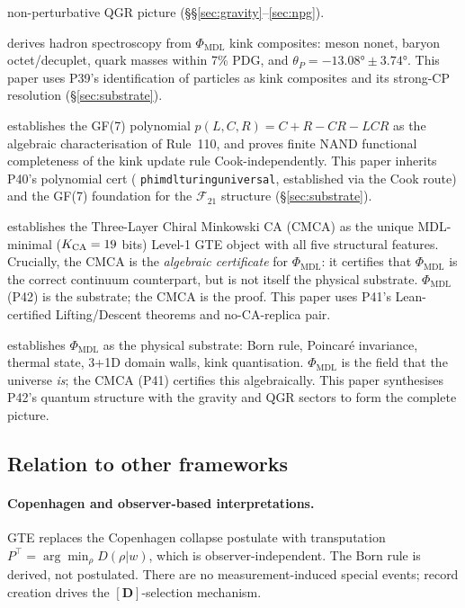 \documentclass[11pt]{article}
\theoremstyle{remark}
\newcommand{\PHIMDL}{\Phi_{\mathrm{MDL}}}
\newcommand{\lean}[1]{%
  \penalty-100
  \begingroup\def\_{\textunderscore\allowbreak}\texttt{#1}\endgroup}
\newcommand{\FTT}{\mathcal{F}_{21}}
\begin{document}
\begin{description}[noitemsep]
  non-perturbative QGR picture (\S\S\ref{sec:gravity}--\ref{sec:npg}).
\item[P39~\cite{SpivackGTEQCDStructure}] derives hadron spectroscopy from $\PHIMDL$
  kink composites: meson nonet, baryon octet/decuplet, quark masses within 7\%
  PDG, and $\theta_P = -13.08°\pm3.74°$.  This paper uses P39's identification
  of particles as kink composites and its strong-CP resolution (\S\ref{sec:substrate}).
\item[P40~\cite{SpivackGF7Universality}] establishes the GF(7) polynomial
  $p(L,C,R)=C+R-CR-LCR$ as the algebraic characterisation of Rule~110,
  and proves finite NAND functional completeness of the kink update rule
  Cook-independently.  This paper inherits P40's polynomial cert
  (\lean{phimdl\_turing\_universal}, established via the Cook route) and the
  GF(7) foundation for the $\FTT$ structure (\S\ref{sec:substrate}).
\item[P41~\cite{SpivackCMCA}] establishes the Three-Layer Chiral Minkowski CA
  (CMCA) as the unique MDL-minimal ($K_{\rm CA}=19$ bits) Level-1 GTE object
  with all five structural features.  Crucially, the CMCA is the
  \emph{algebraic certificate} for $\PHIMDL$: it certifies that $\PHIMDL$ is
  the correct continuum counterpart, but is not itself the physical substrate.
  $\PHIMDL$ (P42) is the substrate; the CMCA is the proof.  This paper
  uses P41's Lean-certified Lifting/Descent theorems and no-CA-replica pair.
\item[P42~\cite{SpivackPhiMDLField}] establishes $\PHIMDL$ as the physical
  substrate: Born rule, Poincaré invariance, thermal state, 3+1D domain walls,
  kink quantisation.  $\PHIMDL$ is the field that the universe \emph{is}; the
  CMCA (P41) certifies this algebraically.  This paper synthesises P42's
  quantum structure with the gravity and QGR sectors to form the complete picture.
\end{description}

\subsection{Relation to other frameworks}

\paragraph{Copenhagen and observer-based interpretations.}
GTE replaces the Copenhagen collapse postulate with transputation
$P^\top = \arg\min_\rho D(\rho|w)$, which is observer-independent.
The Born rule is derived, not postulated.  There are no measurement-induced
special events; record creation drives the $[\mathbf{D}]$-selection mechanism.
\end{document}
